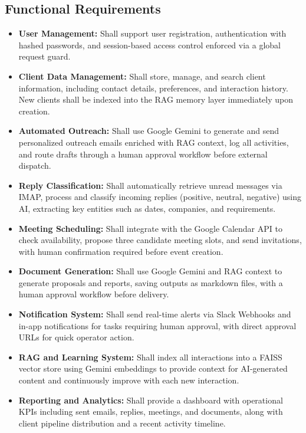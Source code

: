 \documentclass[12pt,a4paper]{report}
\begin{document}
\subsection{Functional Requirements}
\begin{itemize}
    \item \textbf{User Management:} Shall support user registration, authentication with hashed passwords, and session-based access control enforced via a global request guard.
    \item \textbf{Client Data Management:} Shall store, manage, and search client information, including contact details, preferences, and interaction history. New clients shall be indexed into the RAG memory layer immediately upon creation.
    \item \textbf{Automated Outreach:} Shall use Google Gemini to generate and send personalized outreach emails enriched with RAG context, log all activities, and route drafts through a human approval workflow before external dispatch.
    \item \textbf{Reply Classification:} Shall automatically retrieve unread messages via IMAP, process and classify incoming replies (positive, neutral, negative) using AI, extracting key entities such as dates, companies, and requirements.
    \item \textbf{Meeting Scheduling:} Shall integrate with the Google Calendar API to check availability, propose three candidate meeting slots, and send invitations, with human confirmation required before event creation.
    \item \textbf{Document Generation:} Shall use Google Gemini and RAG context to generate proposals and reports, saving outputs as markdown files, with a human approval workflow before delivery.
    \item \textbf{Notification System:} Shall send real-time alerts via Slack Webhooks and in-app notifications for tasks requiring human approval, with direct approval URLs for quick operator action.
    \item \textbf{RAG and Learning System:} Shall index all interactions into a FAISS vector store using Gemini embeddings to provide context for AI-generated content and continuously improve with each new interaction.
    \item \textbf{Reporting and Analytics:} Shall provide a dashboard with operational KPIs including sent emails, replies, meetings, and documents, along with client pipeline distribution and a recent activity timeline.
\end{itemize}
\end{document}
